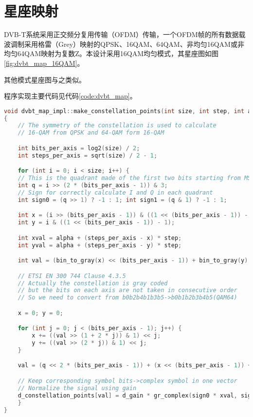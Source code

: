	\section{星座映射}
		\par DVB-T系统采用正交频分复用传输（OFDM）传输，一个OFDM帧的所有数据载波调制采用格雷（Grey）映射的QPSK、16QAM、64QAM、非均匀16QAM或非均匀64QAM映射为复数Z。本设计采用16QAM均匀模式，其星座图如图\ref{fig:dvbt_map_16QAM}。
		
		\par 其他模式星座图与之类似。
		\par 程序实现主要代码见代码\ref{code:dvbt_map}。
		\begin{lstlisting}[caption = {星座映射},label = {code:dvbt_map}, language = C++ ]
void dvbt_map_impl::make_constellation_points(int size, int step, int alpha)
{
	// The symmetry of the constellation is used to calculate
	// 16-QAM from QPSK and 64-QAM form 16-QAM

	int bits_per_axis = log2(size) / 2;
	int steps_per_axis = sqrt(size) / 2 - 1;

	for (int i = 0; i < size; i++) {
	// This is the quadrant made of the first two bits starting from MSB
	int q = i >> (2 * (bits_per_axis - 1)) & 3;
	// Sign for correctly calculate I and Q in each quadrant
	int sign0 = (q >> 1) ? -1 : 1; int sign1 = (q & 1) ? -1 : 1;

	int x = (i >> (bits_per_axis - 1)) & ((1 << (bits_per_axis - 1)) - 1);
	int y = i & ((1 << (bits_per_axis - 1)) - 1);

	int xval = alpha + (steps_per_axis - x) * step;
	int yval = alpha + (steps_per_axis - y) * step;

	int val = (bin_to_gray(x) << (bits_per_axis - 1)) + bin_to_gray(y);

	// ETSI EN 300 744 Clause 4.3.5
	// Actually the constellation is gray coded
	// but the bits on each axis are not taken in consecutive order
	// So we need to convert from b0b2b4b1b3b5->b0b1b2b3b4b5(QAM64)

	x = 0; y = 0;

	for (int j = 0; j < (bits_per_axis - 1); j++) {
		x += ((val >> (1 + 2 * j)) & 1) << j;
		y += ((val >> (2 * j)) & 1) << j;
	}

	val = (q << 2 * (bits_per_axis - 1)) + (x << (bits_per_axis - 1)) + y;

	// Keep corresponding symbol bits->complex symbol in one vector
	// Normalize the signal using gain
	d_constellation_points[val] = d_gain * gr_complex(sign0 * xval, sign1 * yval);
	}
}
		\end{lstlisting}
